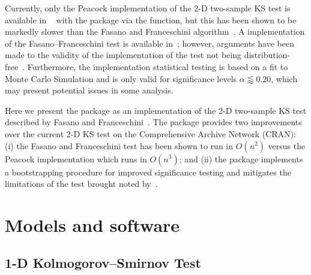\documentclass[codesnippet]{jss}
\newcommand{\fct}[1]{\code{#1()}}
\begin{document}
Currently, only the Peacock implementation of the 2-D two-sample KS
test is available in ~\citep{R} with the
 package via the \fct{peacock2} function, but this
has been shown to be markedly slower than the Fasano and Franceschini
algorithm~\citep{Lopes2007}. A  implementation of the
Fasano--Franceschini test is available in~\cite{numericalRecipes};
however, arguments have been made to the validity of the
implementation of the test not being
distribution-free~\citep{Babu2006}. Furthermore, the 
implementation statistical testing is based on a fit to Monte Carlo
Simulation and is only valid for significance levels $\alpha \lessapprox 0.20$,
which may present potential issues in some analysis.

Here we present the  package as an
 implementation of the 2-D two-sample KS test described
by Fasano and Franceschini~\citep{Fasano1987}. The
 package provides two improvements over
the current 2-D KS test on the Comprehensive  Archive
Network (CRAN): (i) the Fasano and Franceschini test has been shown to
run in $O(n^2)$ versus the Peacock implementation which runs in
$O(n^3)$; and (ii) the package implements a bootstrapping procedure
for improved significance testing and mitigates the limitations of
the test brought noted by~\citep{Babu2006}.

\section{Models and software} \label{sec:models}

\subsection{1-D Kolmogorov--Smirnov Test}
\end{document}
